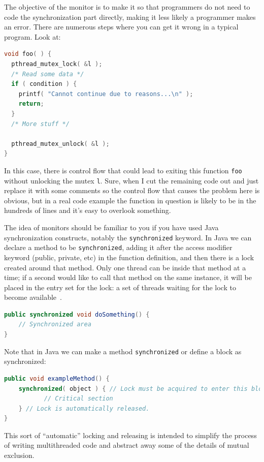 \documentclass[a4paper]{report}
\begin{document}
The objective of the monitor is to make it so that programmers do not need to code the synchronization part directly, making it less likely a programmer makes an error. There are numerous steps where you can get it wrong in a typical program. Look at:

\begin{lstlisting}[language=C]
void foo( ) {
  pthread_mutex_lock( &l );
  /* Read some data */
  if ( condition ) {
    printf( "Cannot continue due to reasons...\n" );
    return;
  }
  /* More stuff */
   
  pthread_mutex_unlock( &l );
}
\end{lstlisting}

In this case, there is control flow that could lead to exiting this function \texttt{foo} without unlocking the mutex \texttt{l}. Sure, when I cut the remaining code out and just replace it with some comments so the control flow that causes the problem here is obvious, but in a real code example the function in question is likely to be in the hundreds of lines and it's easy to overlook something.

The idea of monitors should be familiar to you if you have used Java synchronization constructs, notably the \texttt{synchronized} keyword. In Java we can declare a method to be \texttt{synchronized}, adding it after the access modifier keyword (public, private, etc) in the function definition, and then there is a lock created around that method. Only one thread can be inside that method at a time; if a second would like to call that method on the same instance, it will be placed in the entry set for the lock: a set of threads waiting for the lock to become available~\cite{osc}.

\begin{lstlisting}[language=Java]
public synchronized void doSomething() {
    // Synchronized area
}
\end{lstlisting}


Note that in Java we can make a method \texttt{synchronized} or define a block as synchronized:

\begin{lstlisting}[language=Java]
public void exampleMethod() {
    synchronized( object ) { // Lock must be acquired to enter this block
           // Critical section 
    } // Lock is automatically released.
}
\end{lstlisting}

This sort of ``automatic'' locking and releasing is intended to simplify the process of writing multithreaded code and abstract away some of the details of mutual exclusion.
\end{document}
